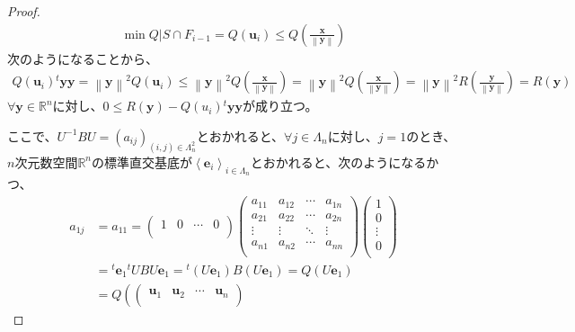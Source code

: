 \documentclass[dvipdfmx]{jsarticle}
\begin{document}
\begin{proof}
\begin{align*}
\min{Q|S \cap F_{i - 1}} = Q\left( \mathbf{u}_{i} \right) \leq Q\left( \frac{\mathbf{x}}{\left\| \mathbf{y} \right\|} \right)
\end{align*}
次のようになることから、
\begin{align*}
Q\left( \mathbf{u}_{i} \right){}^t \mathbf{yy} = \left\| \mathbf{y} \right\|^{2}Q\left( \mathbf{u}_{i} \right) \leq \left\| \mathbf{y} \right\|^{2}Q\left( \frac{\mathbf{x}}{\left\| \mathbf{y} \right\|} \right) = \left\| \mathbf{y} \right\|^{2}Q\left( \frac{\mathbf{x}}{\left\| \mathbf{y} \right\|} \right) = \left\| \mathbf{y} \right\|^{2}R\left( \frac{\mathbf{y}}{\left\| \mathbf{y} \right\|} \right) = R\left( \mathbf{y} \right)
\end{align*}
$\forall\mathbf{y} \in \mathbb{R}^{n}$に対し、$0 \leq R\left( \mathbf{y} \right) - Q\left( u_{i} \right){}^t \mathbf{yy}$が成り立つ。\par
ここで、$U^{- 1}BU = \left( a_{ij} \right)_{(i,j) \in \varLambda_{n}^{2}}$とおかれると、$\forall j \in \varLambda_{n}$に対し、$j = 1$のとき、$n$次元数空間$\mathbb{R}^{n}$の標準直交基底が$\left\langle \mathbf{e}_{i} \right\rangle_{i \in \varLambda_{n}}$とおかれると、次のようになるかつ、
\begin{align*}
a_{1j} &= a_{11} = \begin{pmatrix}
1 & 0 & \cdots & 0 \\
\end{pmatrix}\begin{pmatrix}
a_{11} & a_{12} & \cdots & a_{1n} \\
a_{21} & a_{22} & \cdots & a_{2n} \\
 \vdots & \vdots & \ddots & \vdots \\
a_{n1} & a_{n2} & \cdots & a_{nn} \\
\end{pmatrix}\begin{pmatrix}
1 \\
0 \\
 \vdots \\
0 \\
\end{pmatrix}\\
&={}^t \mathbf{e}_{1}{}^t UBU\mathbf{e}_{1} ={}^t \left( U\mathbf{e}_{1} \right)B\left( U\mathbf{e}_{1} \right) = Q\left( U\mathbf{e}_{1} \right)\\
&= Q\left( \begin{pmatrix}
\mathbf{u}_{1} & \mathbf{u}_{2} & \cdots & \mathbf{u}_{n} \\

\end{pmatrix}
\end{align*}
\end{proof}
\end{document}
